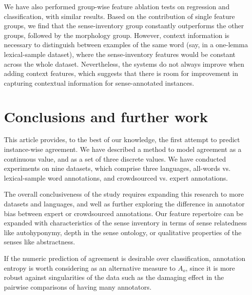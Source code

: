 \documentclass[11pt,a4paper]{article}
\begin{document}
We have also performed group-wise feature ablation tests on regression and classification, with similar results. Based on the contribution of single feature groups, we find that the sense-inventory group constantly outperforms the other groups, followed by the morphology group. 
However, context information is necessary to distinguish between examples of the same word (say, in a one-lemma lexical-sample dataset), where the sense-inventory features would be constant across the whole dataset. Nevertheless, the systems do not always improve when adding context features, which suggests that there is room for improvement in capturing contextual information for sense-annotated instances.
\section{Conclusions and further work}
This article provides, to the best of our knowledge, the first attempt to predict instance-wise agreement.
We have described a method to model agreement as a continuous value, and as a set of three discrete values. We have conducted experiments on nine datasets, which comprise three languages, all-words vs. lexical-sample word annotations, and crowdsourced vs. expert annotations. 


The overall conclusiveness of the study requires expanding this research to more datasets and languages, and well as further exploring the difference in annotator bias between expert or crowdsourced annotations. Our feature repertoire can be expanded with characteristics of the sense inventory in terms of sense relatedness like autohyponymy, depth in the sense ontology, or qualitative properties of the senses like abstractness.



If the numeric prediction of agreement is desirable over classification, annotation entropy \cite{Lopez2015} is worth considering as an alternative measure to $A_o$, since it is more robust against singularities of the data such as the damaging effect in the pairwise comparisons of having many annotators.




\end{document}
